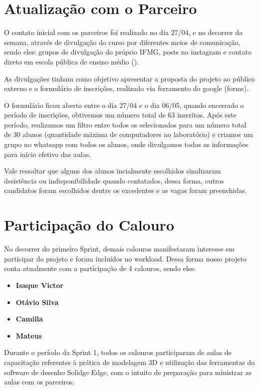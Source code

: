 \documentclass [12 pt ,a4 paper]{article}
\begin{document}
\section {Atualização com o Parceiro}

O contato inicial com os parceiros foi realizado no dia 27/04, e no decorrer da semana, através de divulgação do curso por diferentes meios de comunicação, sendo eles: grupos de divulgação do próprio IFMG, posts no instagram e contato direto em escola pública de ensino médio ().

As divulgações tinham como objetivo apresentar a proposta do projeto ao público externo e o formulário de inscrições, realizado via ferramento do google (forms).

O formulário ficou aberto entre o dia 27/04 e o dia 06/05, quando encerrado o período de inscrições, obtivemos um número total de 63 inscritos. Após este período, realizamos um filtro entre todos os selecionados para um número total de 30 alunos (quantidade máxima de computadores no laboratório) e criamos um grupo no whatsapp com todos os alunos, onde divulgamos todas as informações para início efetivo das aulas.

Vale ressaltar que alguns dos alunos incialmente escolhidos sinalizaram desistência ou indisponibilidade quando contatados, dessa forma, outros candidatos foram escolhidos dentre os excedentes e as vagas foram preenchidas.


\section {Participação do Calouro}

No decorrer do primeiro Sprint, demais calouros manifestaram interesse em participar do projeto e foram incluídos no workload. Dessa forma nosso projeto conta atualmente com a participação de 4 calouros, sendo eles:

\begin{itemize}
    \item \textbf{Isaque Victor}
    \item \textbf{Otávio Silva}
    \item \textbf{Camilla}
    \item \textbf{Mateus}
\end{itemize}

Durante o período da Sprint 1, todos os calouros participaram de aulas de capacitação referentes à prática de modelagem 3D e utilização das ferramentas do software de desenho Solidge Edge, com o intuito de preparação para ministrar as aulas com os parceiros.
\end{document}
